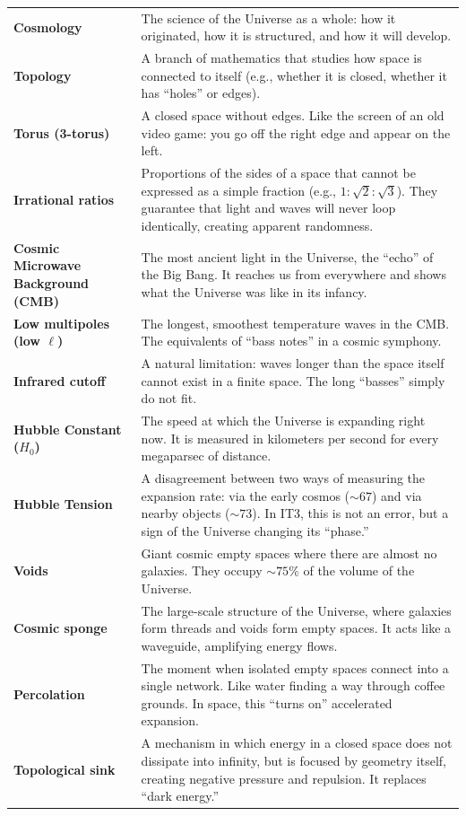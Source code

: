 \documentclass[12pt,a4paper,oneside]{book}
\begin{document}
\begin{longtable}{>{\bfseries}p{4.5cm}p{10cm}}
\textbf{Cosmology} & The science of the Universe as a whole: how it originated, how it is structured, and how it will develop. \\
\textbf{Topology} & A branch of mathematics that studies how space is connected to itself (e.g., whether it is closed, whether it has “holes” or edges). \\
\textbf{Torus (3-torus)} & A closed space without edges. Like the screen of an old video game: you go off the right edge and appear on the left. \\
\textbf{Irrational ratios} & Proportions of the sides of a space that cannot be expressed as a simple fraction (e.g., $1:\sqrt{2}:\sqrt{3}$). They guarantee that light and waves will never loop identically, creating apparent randomness. \\
\textbf{Cosmic Microwave Background (CMB)} & The most ancient light in the Universe, the “echo” of the Big Bang. It reaches us from everywhere and shows what the Universe was like in its infancy. \\
\textbf{Low multipoles (low $\ell$)} & The longest, smoothest temperature waves in the CMB. The equivalents of “bass notes” in a cosmic symphony. \\
\textbf{Infrared cutoff} & A natural limitation: waves longer than the space itself cannot exist in a finite space. The long “basses” simply do not fit. \\
\textbf{Hubble Constant ($H_0$)} & The speed at which the Universe is expanding right now. It is measured in kilometers per second for every megaparsec of distance. \\
\textbf{Hubble Tension} & A disagreement between two ways of measuring the expansion rate: via the early cosmos ($\sim 67$) and via nearby objects ($\sim 73$). In IT3, this is not an error, but a sign of the Universe changing its “phase.” \\
\textbf{Voids} & Giant cosmic empty spaces where there are almost no galaxies. They occupy $\sim 75\%$ of the volume of the Universe. \\
\textbf{Cosmic sponge} & The large-scale structure of the Universe, where galaxies form threads and voids form empty spaces. It acts like a waveguide, amplifying energy flows. \\
\textbf{Percolation} & The moment when isolated empty spaces connect into a single network. Like water finding a way through coffee grounds. In space, this “turns on” accelerated expansion. \\
\textbf{Topological sink} & A mechanism in which energy in a closed space does not dissipate into infinity, but is focused by geometry itself, creating negative pressure and repulsion. It replaces “dark energy.” \\

\end{longtable}
\end{document}
